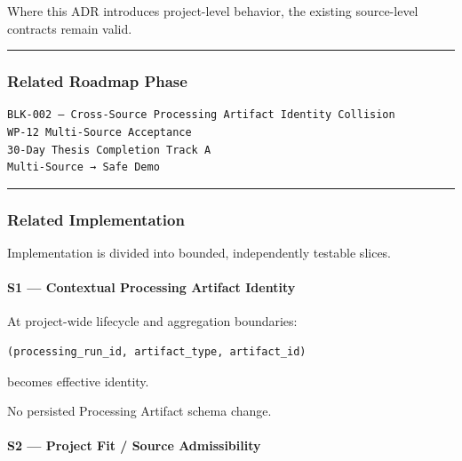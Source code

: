 Where this ADR introduces project-level behavior, the existing source-level contracts remain valid.

\begin{center}\rule{0.5\linewidth}{0.5pt}\end{center}

\hypertarget{related-roadmap-phase}{%
\subsubsection{Related Roadmap Phase}\label{related-roadmap-phase}}

\begin{verbatim}
BLK-002 — Cross-Source Processing Artifact Identity Collision
WP-12 Multi-Source Acceptance
30-Day Thesis Completion Track A
Multi-Source → Safe Demo
\end{verbatim}

\begin{center}\rule{0.5\linewidth}{0.5pt}\end{center}

\hypertarget{related-implementation}{%
\subsubsection{Related Implementation}\label{related-implementation}}

Implementation is divided into bounded, independently testable slices.

\hypertarget{s1--contextual-processing-artifact-identity}{%
\paragraph{S1 --- Contextual Processing Artifact Identity}\label{s1--contextual-processing-artifact-identity}}

At project-wide lifecycle and aggregation boundaries:

\begin{verbatim}
(processing_run_id, artifact_type, artifact_id)
\end{verbatim}

becomes effective identity.

No persisted Processing Artifact schema change.

\hypertarget{s2--project-fit--source-admissibility}{%
\paragraph{S2 --- Project Fit / Source Admissibility}\label{s2--project-fit--source-admissibility}}


